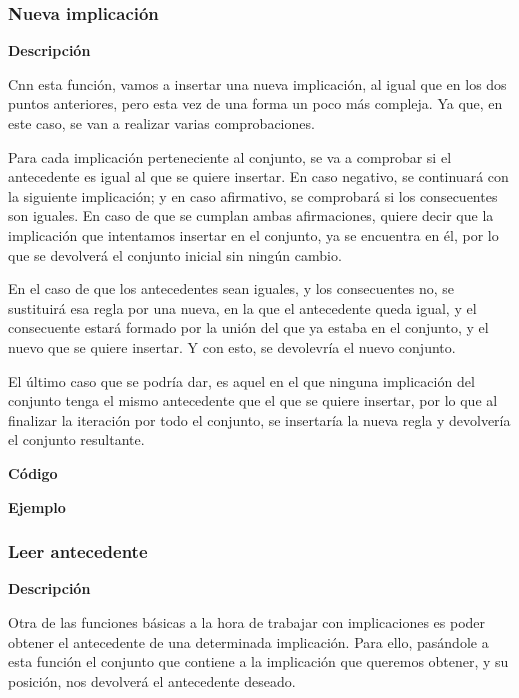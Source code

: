 \subsubsection{Nueva implicaci\'on}

    \textbf{Descripci\'on}

    Cnn esta funci\'on, vamos a insertar una nueva implicaci\'on, al igual que en los dos puntos anteriores, pero esta vez 
    de una forma un poco m\'as compleja. Ya que, en este caso, se van a realizar varias comprobaciones.

    Para cada implicaci\'on perteneciente al conjunto, se va a comprobar si el antecedente es igual al que se quiere insertar.
    En caso negativo, se continuar\'a con la siguiente implicaci\'on; y en caso afirmativo, se comprobar\'a si los consecuentes son 
    iguales. En caso de que se cumplan ambas afirmaciones, quiere decir que la implicaci\'on que intentamos insertar en el conjunto, 
    ya se encuentra en \'el, por lo que se devolver\'a el conjunto inicial sin ning\'un cambio.

    En el caso de que los antecedentes sean iguales, y los consecuentes no, se sustituir\'a esa regla por una nueva, en la que el antecedente 
    queda igual, y el consecuente estar\'a formado por la uni\'on del que ya estaba en el conjunto, y el nuevo que se quiere insertar. Y con 
    esto, se devolevr\'ia el nuevo conjunto.

    El \'ultimo caso que se podr\'ia dar, es aquel en el que ninguna implicaci\'on del conjunto tenga el mismo antecedente que el que se 
    quiere insertar, por lo que al finalizar la iteraci\'on por todo el conjunto, se insertar\'ia la nueva regla y devolver\'ia el conjunto 
    resultante.


    \textbf{C\'odigo}


    \textbf{Ejemplo}


\subsubsection{Leer antecedente}

    \textbf{Descripci\'on}

    Otra de las funciones b\'asicas a la hora de trabajar con implicaciones es poder obtener el antecedente de una determinada 
    implicaci\'on. Para ello, pas\'andole a esta funci\'on el conjunto que contiene a la implicaci\'on que queremos obtener, y su 
    posici\'on, nos devolver\'a el antecedente deseado.

